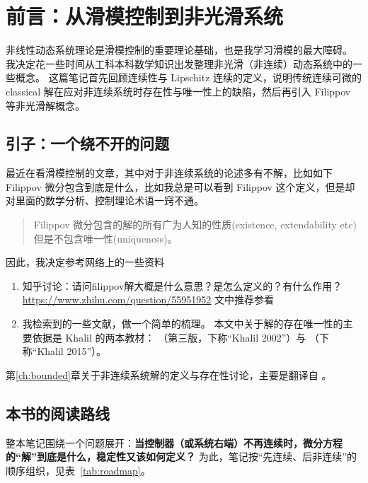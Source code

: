 \chapter{前言：从滑模控制到非光滑系统}\label{ch:intro}

非线性动态系统理论是滑模控制的重要理论基础，也是我学习滑模的最大障碍。
我决定花一些时间从工科本科数学知识出发整理非光滑（非连续）动态系统中的一些概念。
这篇笔记首先回顾连续性与 Lipschitz 连续的定义，说明传统连续可微的 classical 解在应对非连续系统时存在性与唯一性上的缺陷，然后再引入 Filippov 等非光滑解概念。

\section{引子：一个绕不开的问题}

最近在看滑模控制的文章，其中对于非连续系统的论述多有不解，比如如下 Filippov 微分包含到底是什么，比如我总是可以看到 Filippov 这个定义，但是却对里面的数学分析、控制理论术语一窍不通。
\begin{quote}
  Filippov 微分包含的解的所有广为人知的性质(existence, extendability
  etc)但是不包含唯一性(uniqueness)。
\end{quote}
因此，我决定参考网络上的一些资料
\begin{enumerate}
  \item
    知乎讨论：请问filippov解大概是什么意思？是怎么定义的？有什么作用？
    \url{https://www.zhihu.com/question/55951952} 文中推荐参看\cite{cortesDiscontinuousDynamicalSystems2008,hanTheoryControlSystems2016}
  \item
    我检索到的一些文献，做一个简单的梳理。
    本文中关于解的存在唯一性的主要依据是 Khalil 的两本教材：
    \cite{khalilNonlinearSystems}（第三版，下称“Khalil 2002”）与
    \cite{khalilNonlinearControl2015}（下称“Khalil 2015”）。
\end{enumerate}
第\ref{ch:bounded}章关于非连续系统解的定义与存在性讨论，主要是翻译自 \cite{cortesDiscontinuousDynamicalSystems2008}。

\section{本书的阅读路线}\label{sec:reading-guide}

整本笔记围绕一个问题展开：\textbf{当控制器（或系统右端）不再连续时，微分方程的“解”到底是什么，稳定性又该如何定义？}
为此，笔记按“先连续、后非连续”的顺序组织，见表~\ref{tab:roadmap}。

